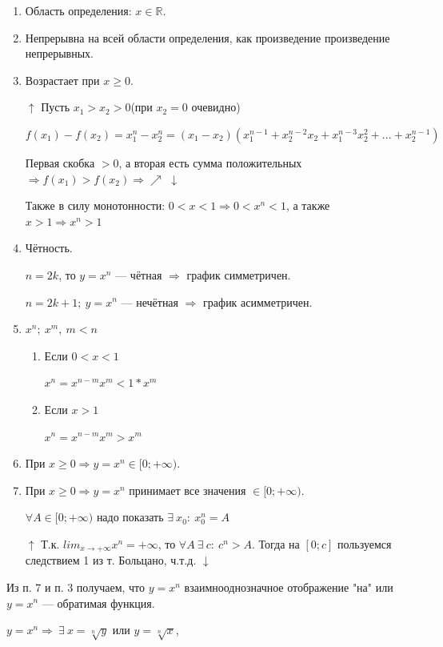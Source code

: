 \documentclass{article}
\begin{document}
    \begin{enumerate}
        \item Область определения: \( x \in \mathbb{R}\).
        \item Непрерывна на всей области определения, как произведение произведение непрерывных.
        \item Возрастает при \(x \geq 0\).
        
        \(\uparrow\) Пусть \(x_1 > x_2 > 0\)(при \(x_2=0\) очевидно)

        \( f(x_1) - f(x_2) = x_1^n - x_2^n = (x_1 - x_2)(x_1^{n - 1} + x_2^{n - 2}x_2 + x_1^{n - 3}x_2^2 + ... + x_2^{n - 1}) \) 

        Первая скобка \( > 0 \), а вторая есть сумма положительных \( \Rightarrow f(x_1) > f(x_2) \Rightarrow \nearrow\) \(\downarrow\)
        
        Также в силу монотонности: \( 0 < x < 1 \Rightarrow 0 < x^n < 1 \), а также \(x > 1 \Rightarrow x^n > 1\)

        \item Чётность.
        
        \( n = 2k \), то \( y = x^n \) --- чётная \( \Rightarrow \) график симметричен.
        
        \(n = 2k + 1;\ y = x^n\) --- нечётная \(\Rightarrow\) график асимметричен.
        
        \item \(x^n;\ x^m,\ m < n\)

        \begin{enumerate}
            \item Если \(0 < x < 1\)

            \(x^n = x^{n-m}x^m < 1 * x^m\)

            \item Если \(x > 1\)

            \(x^n = x^{n-m}x^m > x^m\)
        \end{enumerate}
    
        \item При \( x \geq 0 \Rightarrow y = x^n \in [0; +\infty) \).
        \item При \( x \geq 0 \Rightarrow y = x^n \) принимает все значения \( \in [0; +\infty) \).

        \(\forall A \in [0; +\infty)\) надо показать \(\exists\ x_0:\ x_0^n = A\)

        \(\uparrow\) Т.к. \(lim_{x \rightarrow +\infty} x^n = +\infty\), то \(\forall A\ \exists\ c:\ c^n > A\). Тогда на \([0; c]\) пользуемся следствием 1 из т. Больцано, ч.т.д. \(\downarrow\)
        
    \end{enumerate}

    Из п. 7 и п. 3 получаем, что \( y = x^n \) взаимнооднозначное отображение "на" или \( y = x^n \) --- обратимая функция.

    \( y = x^n \Rightarrow\ \exists\ x = \sqrt[n]{y} \) или \( y = \sqrt[n]{x} \),
    
\end{document}

